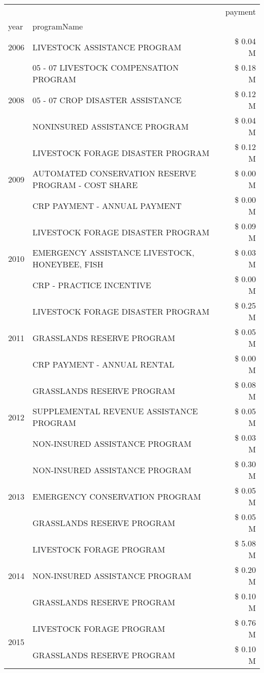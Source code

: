 \begin{tabular}{llr}
\toprule
 &  & payment \\
year & programName &  \\
\midrule
2006 & LIVESTOCK ASSISTANCE PROGRAM & \$ 0.04 M \\
\cline{1-3}
\multirow[t]{3}{*}{2008} & 05 - 07 LIVESTOCK COMPENSATION PROGRAM & \$ 0.18 M \\
 & 05 - 07 CROP DISASTER ASSISTANCE & \$ 0.12 M \\
 & NONINSURED ASSISTANCE PROGRAM & \$ 0.04 M \\
\cline{1-3}
\multirow[t]{3}{*}{2009} & LIVESTOCK FORAGE DISASTER  PROGRAM & \$ 0.12 M \\
 & AUTOMATED CONSERVATION RESERVE PROGRAM - COST SHARE & \$ 0.00 M \\
 & CRP PAYMENT - ANNUAL PAYMENT & \$ 0.00 M \\
\cline{1-3}
\multirow[t]{3}{*}{2010} & LIVESTOCK FORAGE DISASTER  PROGRAM & \$ 0.09 M \\
 & EMERGENCY ASSISTANCE LIVESTOCK, HONEYBEE, FISH & \$ 0.03 M \\
 & CRP - PRACTICE INCENTIVE & \$ 0.00 M \\
\cline{1-3}
\multirow[t]{3}{*}{2011} & LIVESTOCK FORAGE DISASTER PROGRAM & \$ 0.25 M \\
 & GRASSLANDS RESERVE PROGRAM & \$ 0.05 M \\
 & CRP PAYMENT - ANNUAL RENTAL & \$ 0.00 M \\
\cline{1-3}
\multirow[t]{3}{*}{2012} & GRASSLANDS RESERVE PROGRAM & \$ 0.08 M \\
 & SUPPLEMENTAL REVENUE ASSISTANCE PROGRAM & \$ 0.05 M \\
 & NON-INSURED ASSISTANCE PROGRAM & \$ 0.03 M \\
\cline{1-3}
\multirow[t]{3}{*}{2013} & NON-INSURED ASSISTANCE PROGRAM & \$ 0.30 M \\
 & EMERGENCY CONSERVATION PROGRAM & \$ 0.05 M \\
 & GRASSLANDS RESERVE PROGRAM & \$ 0.05 M \\
\cline{1-3}
\multirow[t]{3}{*}{2014} & LIVESTOCK FORAGE PROGRAM & \$ 5.08 M \\
 & NON-INSURED ASSISTANCE PROGRAM & \$ 0.20 M \\
 & GRASSLANDS RESERVE PROGRAM & \$ 0.10 M \\
\cline{1-3}
\multirow[t]{3}{*}{2015} & LIVESTOCK FORAGE PROGRAM & \$ 0.76 M \\
 & GRASSLANDS RESERVE PROGRAM & \$ 0.10 M \\

\end{tabular}
